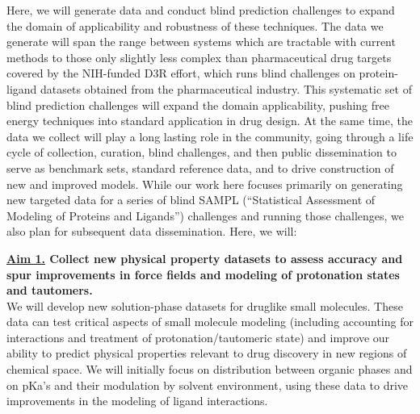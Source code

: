 \documentclass[11pt]{article}
\begin{document}
Here, we will generate data and conduct blind prediction challenges to expand the domain of applicability and robustness of these techniques. 
The data we generate will span the range between systems which are tractable with current methods to those only slightly less complex than pharmaceutical drug targets covered by the NIH-funded D3R effort, which runs blind challenges on protein-ligand datasets obtained from the pharmaceutical industry.
This systematic set of blind prediction challenges will expand the domain applicability, pushing free energy techniques into standard application in drug design.
At the same time, the data we collect will play a long lasting role in the community, going through a life cycle of collection, curation, blind challenges, and then public dissemination to serve as benchmark sets,
standard reference data, and to drive construction of new and improved models. 
While our work here focuses primarily on generating new targeted data for a series of blind SAMPL (``Statistical Assessment of Modeling of Proteins and Ligands'') challenges and running those challenges, we also plan for subsequent data dissemination. Here, we will: 


{\bf \underline{Aim 1.} Collect new physical property datasets to assess accuracy and spur improvements in force fields and modeling of protonation states and tautomers.}\\
We will develop new solution-phase datasets for druglike small molecules. 
These data can test critical aspects of small molecule modeling (including accounting for interactions and treatment of protonation/tautomeric state) and improve our ability to predict physical properties relevant to drug discovery in new regions of chemical space. 
We will initially focus on distribution between organic phases and on pKa's and their modulation by solvent environment, using these data to drive improvements in the modeling of ligand interactions.
\end{document}
